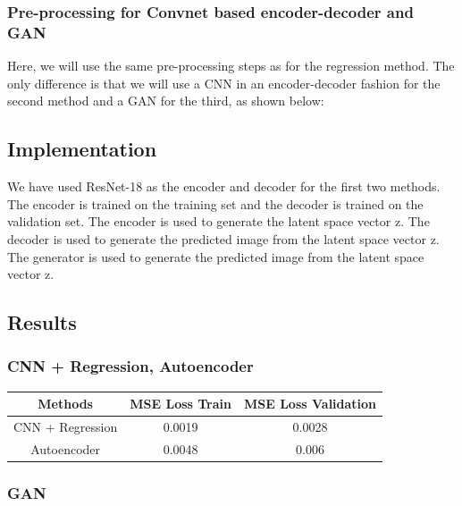 \documentclass{article}
\begin{document}
\subsubsection{Pre-processing for Convnet based encoder-decoder and GAN}
Here, we will use the same pre-processing steps as for the regression method. 
The only difference is that we will use a CNN in an encoder-decoder fashion for the second method and a GAN for the third, as shown below:

\subsection{Implementation}
We have used ResNet-18 as the encoder and decoder for the first two methods. 
The encoder is trained on the training set and the decoder is trained on the validation set.
The encoder is used to generate the latent space vector z.
The decoder is used to generate the predicted image from the latent space vector z.
The generator is used to generate the predicted image from the latent space vector z.
\pagebreak
\subsection{Results}

\subsubsection{CNN + Regression, Autoencoder}

\begin{center}
\begin{tabular}{ |c |c|c| } 
\hline
\textbf{Methods} & \textbf{MSE Loss Train} & \textbf{MSE Loss Validation} \\
\hline
CNN + Regression & 0.0019 & 0.0028 \\
\hline
Autoencoder & 0.0048 & 0.006   \\ 
\hline
\end{tabular}
\end{center}

\subsubsection{GAN}
\end{document}
